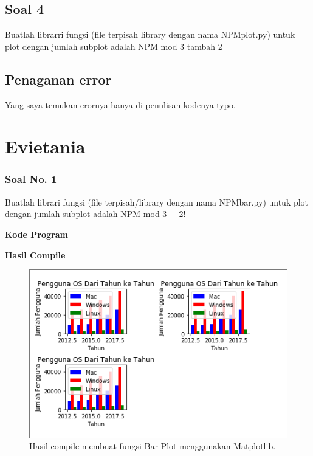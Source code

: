 

\subsection{Soal 4}
Buatlah librarri fungsi (file terpisah library dengan nama NPMplot.py) untuk plot dengan jumlah subplot adalah NPM mod 3 tambah  2



\subsection{Penaganan error}
Yang saya temukan erornya hanya di penulisan kodenya typo.

\section{Evietania}
\subsubsection{Soal No. 1}
\hfill \break
Buatlah librari fungsi (file terpisah/library dengan nama NPMbar.py) untuk plot dengan jumlah subplot adalah NPM mod 3 + 2!

\hfill \break
\textbf{Kode Program}



\hfill \break
\textbf{Hasil Compile}

\begin{figure}[H]
	\includegraphics[width=12cm]{figures/6/Praktek/1174051/p1.png}
	\centering
	\caption{Hasil compile membuat fungsi Bar Plot menggunakan Matplotlib.}
\end{figure}

